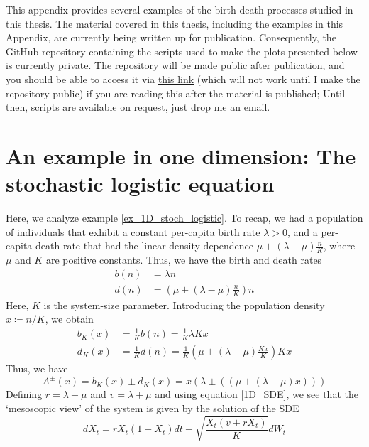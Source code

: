 This appendix provides several examples of the birth-death processes studied in this thesis. The material covered in this thesis, including the examples in this Appendix, are currently being written up for publication. Consequently, the GitHub repository containing the scripts used to make the plots presented below is currently private. The repository will be made public after publication, and you should be able to access it via \href{https://github.com/ThePandalorian/Bhat_MS_thesis_scripts}{this link} (which will not work until I make the repository public) if you are reading this after the material is published; Until then, scripts are available on request, just drop me an email.

\section{An example in one dimension: The stochastic logistic equation}
Here, we analyze example \ref{ex_1D_stoch_logistic}. To recap, we had a population of individuals that exhibit a constant per-capita birth rate $\lambda > 0$, and a per-capita death rate that had the linear density-dependence $\mu + (\lambda-\mu)\frac{n}{K}$, where $\mu$ and $K$ are positive constants. Thus, we have the birth and death rates
\begin{equation}
\label{ex_1D_stoch_logistic_BD_eqns}
\begin{aligned}
    b(n) &= \lambda n\\
    d(n) &= \left(\mu + (\lambda-\mu)\frac{n}{K}\right)n
\end{aligned}
\end{equation}
Here, $K$ is the system-size parameter. Introducing the population density $x\coloneqq n/K$, we obtain
\begin{align*}
    b_K(x) &= \frac{1}{K}b(n) = \frac{1}{K}\lambda Kx\\
    d_K(x) &= \frac{1}{K}d(n) = \frac{1}{K}\left(\mu + (\lambda-\mu)\frac{Kx}{K}\right)Kx
\end{align*}
Thus, we have
\begin{equation*}
    A^{\pm}(x) = b_K(x)\pm d_K(x) = x\left(\lambda \pm \left(\left(\mu + (\lambda-\mu)x\right)\right) \right)
\end{equation*}
Defining $r=\lambda-\mu$ and $v=\lambda+\mu$ and using equation \eqref{1D_SDE}, we 
see that the `mesoscopic view' of the system is given by the solution of the SDE
\begin{equation}\label{ex_1D_stoch_logistic_full_SDE}
dX_t =  rX_t(1-X_t)dt + \sqrt{\frac{X_t(v+rX_t)}{K}}dW_t
\end{equation}
